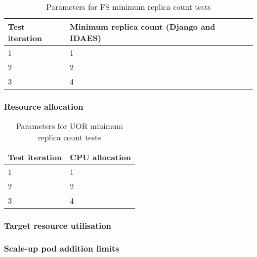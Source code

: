 \begin{table}[h]
    \centering
    \begin{tabularx}{\textwidth}{|X|X|}
        \hline
        \textbf{Test iteration} & \textbf{Minimum replica count (Django and IDAES)}  \\ \hline
        1 & 1 \\ \hline
        2 & 2 \\ \hline
        3 & 4 \\ \hline
    \end{tabularx}
    \caption{Parameters for FS minimum replica count tests}
    \label{table:test-min-replica-count-fs}
\end{table}

\subsubsection{Resource allocation}

\begin{table}[h]
    \centering
    \begin{tabularx}{\textwidth}{|X|X|}
        \hline
        \textbf{Test iteration} & \textbf{CPU allocation}  \\ \hline
        1 & 1 \\ \hline
        2 & 2 \\ \hline
        3 & 4 \\ \hline
    \end{tabularx}
    \caption{Parameters for UOR minimum replica count tests}
    \label{table:test-min-replica-count-uor}
\end{table}

\subsubsection{Target resource utilisation}
\subsubsection{Scale-up pod addition limits}